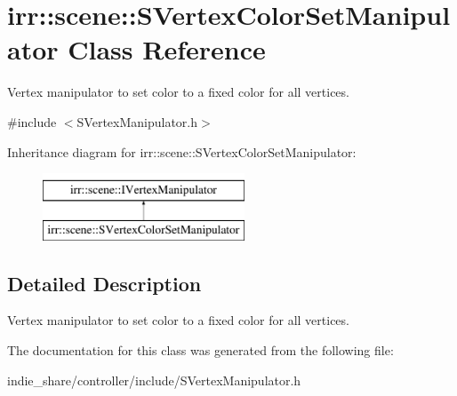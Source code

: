 \hypertarget{classirr_1_1scene_1_1SVertexColorSetManipulator}{}\section{irr\+:\+:scene\+:\+:S\+Vertex\+Color\+Set\+Manipulator Class Reference}
\label{classirr_1_1scene_1_1SVertexColorSetManipulator}


Vertex manipulator to set color to a fixed color for all vertices.  




{\ttfamily \#include $<$S\+Vertex\+Manipulator.\+h$>$}

Inheritance diagram for irr\+:\+:scene\+:\+:S\+Vertex\+Color\+Set\+Manipulator\+:\begin{figure}[H]
\begin{center}
\leavevmode
\includegraphics[height=2.000000cm]{classirr_1_1scene_1_1SVertexColorSetManipulator}
\end{center}
\end{figure}


\subsection{Detailed Description}
Vertex manipulator to set color to a fixed color for all vertices. 

The documentation for this class was generated from the following file\+:\begin{DoxyCompactItemize}
\item 
indie\+\_\+share/controller/include/S\+Vertex\+Manipulator.\+h\end{DoxyCompactItemize}
